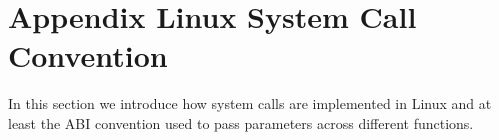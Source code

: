 \chapter{Appendix  Linux System Call Convention}
\label{appendix:A}
In this section we introduce how system calls are implemented in Linux and 
at least the ABI convention used to pass parameters across different functions.



